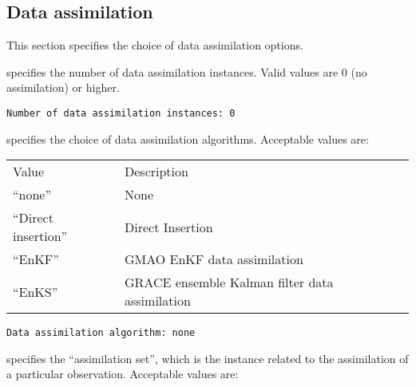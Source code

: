  
 \subsection{Data assimilation} \label{ssec:dataassim}
 This section specifies the choice of data assimilation options. 
 

 
  specifies the 
 number of data assimilation instances. Valid values are 
 0 (no assimilation) or higher.
 

 \begin{Verbatim}[frame=single]
Number of data assimilation instances: 0
 \end{Verbatim}

 
  specifies the choice of data
 assimilation algorithms. 
 Acceptable values are:

 \begin{tabular}{ll}
 Value                & Description                                    \\
 ``none''             & None                                           \\
 ``Direct insertion'' & Direct Insertion                               \\
 ``EnKF''             & GMAO EnKF data assimilation                    \\
 ``EnKS''             & GRACE ensemble Kalman filter data assimilation \\
 \end{tabular}
 

 \begin{Verbatim}[frame=single]
Data assimilation algorithm: none
 \end{Verbatim}

 
  specifies the ``assimilation set'', 
 which is the instance related to the assimilation 
 of a particular observation. 
 Acceptable values are:

